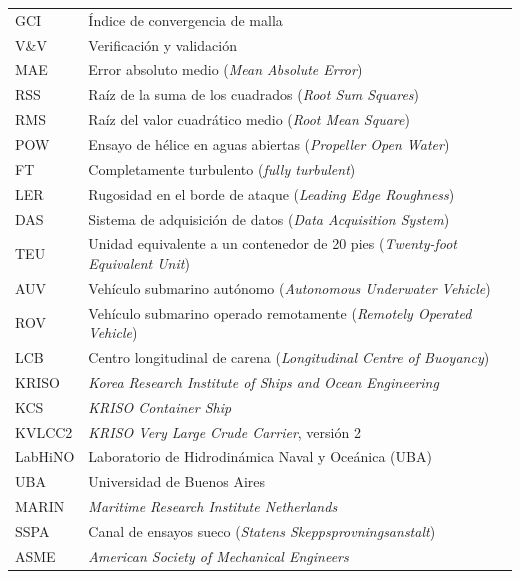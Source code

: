 \begin{longtable}{@{}p{} p{}@{}}
GCI     & Índice de convergencia de malla \\
V\&V    & Verificación y validación \\
MAE     & Error absoluto medio (\textit{Mean Absolute Error}) \\
RSS     & Raíz de la suma de los cuadrados (\textit{Root Sum Squares}) \\
RMS     & Raíz del valor cuadrático medio (\textit{Root Mean Square}) \\
POW     & Ensayo de hélice en aguas abiertas (\textit{Propeller Open Water}) \\
FT      & Completamente turbulento (\textit{fully turbulent}) \\
LER     & Rugosidad en el borde de ataque (\textit{Leading Edge Roughness}) \\
DAS     & Sistema de adquisición de datos (\textit{Data Acquisition System}) \\
TEU     & Unidad equivalente a un contenedor de 20 pies (\textit{Twenty-foot Equivalent Unit}) \\
AUV     & Vehículo submarino autónomo (\textit{Autonomous Underwater Vehicle}) \\
ROV     & Vehículo submarino operado remotamente (\textit{Remotely Operated Vehicle}) \\
LCB     & Centro longitudinal de carena (\textit{Longitudinal Centre of Buoyancy}) \\
KRISO   & \textit{Korea Research Institute of Ships and Ocean Engineering} \\
KCS     & \textit{KRISO Container Ship} \\
KVLCC2  & \textit{KRISO Very Large Crude Carrier}, versión 2 \\
LabHiNO & Laboratorio de Hidrodinámica Naval y Oceánica (UBA) \\
UBA     & Universidad de Buenos Aires \\
MARIN   & \textit{Maritime Research Institute Netherlands} \\
SSPA    & Canal de ensayos sueco (\textit{Statens Skeppsprovningsanstalt}) \\
ASME    & \textit{American Society of Mechanical Engineers} \\
\end{longtable}

\renewcommand{\arraystretch}{1.0}